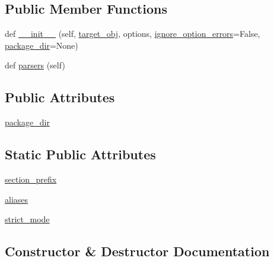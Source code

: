 \subsection*{Public Member Functions}
\begin{DoxyCompactItemize}
\item 
def \hyperlink{classsetuptools_1_1config_1_1ConfigMetadataHandler_a2aeb82de8eeecb53386379ca08736d9b}{\+\_\+\+\_\+init\+\_\+\+\_\+} (self, \hyperlink{classsetuptools_1_1config_1_1ConfigHandler_aa932a185c0e0fd1d98ebc8bceb88b153}{target\+\_\+obj}, options, \hyperlink{classsetuptools_1_1config_1_1ConfigHandler_a5d64dedea13caaf606cde29c6aac8d97}{ignore\+\_\+option\+\_\+errors}=False, \hyperlink{classsetuptools_1_1config_1_1ConfigMetadataHandler_a5ebf68cfa261c5b7c139b9a835d92a06}{package\+\_\+dir}=None)
\item 
def \hyperlink{classsetuptools_1_1config_1_1ConfigMetadataHandler_a79d5728ed108d5aaa690deca115678f1}{parsers} (self)
\end{DoxyCompactItemize}
\subsection*{Public Attributes}
\begin{DoxyCompactItemize}
\item 
\hyperlink{classsetuptools_1_1config_1_1ConfigMetadataHandler_a5ebf68cfa261c5b7c139b9a835d92a06}{package\+\_\+dir}
\end{DoxyCompactItemize}
\subsection*{Static Public Attributes}
\begin{DoxyCompactItemize}
\item 
\hyperlink{classsetuptools_1_1config_1_1ConfigMetadataHandler_a2d5234778e591973dec7405a3072ca1b}{section\+\_\+prefix}
\item 
\hyperlink{classsetuptools_1_1config_1_1ConfigMetadataHandler_afe449eb2495dc8620819a6d36166335a}{aliases}
\item 
\hyperlink{classsetuptools_1_1config_1_1ConfigMetadataHandler_aab767a0aea5ab1fe06d2ea63ef5475f8}{strict\+\_\+mode}
\end{DoxyCompactItemize}


\subsection{Constructor \& Destructor Documentation}
\mbox{\label{classsetuptools_1_1config_1_1ConfigMetadataHandler_a2aeb82de8eeecb53386379ca08736d9b}} 
